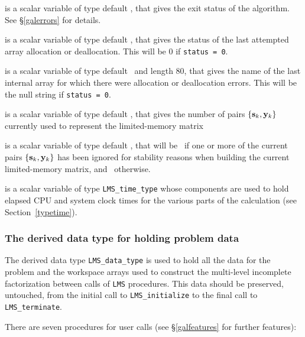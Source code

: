 \documentclass{galahad}
\newcommand{\packagename}{LMS}
\begin{document}
\begin{description}

 is a scalar variable of type default \integer, that gives the
exit status of the algorithm.
See \S\ref{galerrors}
for details.

 is a scalar variable of type default \integer, that gives
the status of the last attempted array allocation or deallocation.
This will be 0 if {\tt status = 0}.

 is a scalar variable of type default \character\
and length 80, that  gives the name of the last internal array
for which there were allocation or deallocation errors.
This will be the null string if {\tt status = 0}.

 is a scalar variable of type default \integer, that
gives the number of pairs $\{{\mathbf{s}}_k,{\mathbf{y}}_k\}$ currently used to represent the
limited-memory matrix

 is a scalar variable of type default \logical, that
will be \true\ if one or more of the current pairs $\{{\mathbf{s}}_k,{\mathbf{y}}_k\}$ has
been ignored for stability reasons when building the current limited-memory
matrix, and \false\ otherwise.

 is a scalar variable of type {\tt \packagename\_time\_type}
whose components are used to hold elapsed CPU and system clock times for
the various parts of the calculation (see Section~\ref{typetime}).

\end{description}


\subsubsection{The derived data type for holding problem data}\label{typedata}
The derived data type
{\tt \packagename\_data\_type}
is used to hold all the data for the problem and the workspace arrays
used to construct the multi-level incomplete factorization between calls of
{\tt \packagename} procedures.
This data should be preserved, untouched, from the initial call to
{\tt \packagename\_initialize}
to the final call to
{\tt \packagename\_terminate}.


\galarguments
There are seven procedures for user calls
(see \S\ref{galfeatures} for further features):
\end{document}
